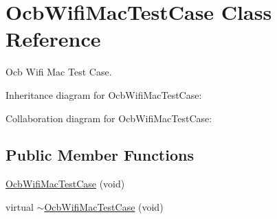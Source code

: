 \hypertarget{classOcbWifiMacTestCase}{}\section{Ocb\+Wifi\+Mac\+Test\+Case Class Reference}
\label{classOcbWifiMacTestCase}


Ocb Wifi Mac Test Case.  




Inheritance diagram for Ocb\+Wifi\+Mac\+Test\+Case\+:


Collaboration diagram for Ocb\+Wifi\+Mac\+Test\+Case\+:
\subsection*{Public Member Functions}
\begin{DoxyCompactItemize}
\item 
\hyperlink{classOcbWifiMacTestCase_a503774d1b0821368459d01a83e90aa0f}{Ocb\+Wifi\+Mac\+Test\+Case} (void)
\item 
virtual \hyperlink{classOcbWifiMacTestCase_aca0b5fda6628634eef99d561556d3420}{$\sim$\+Ocb\+Wifi\+Mac\+Test\+Case} (void)
\end{DoxyCompactItemize}
